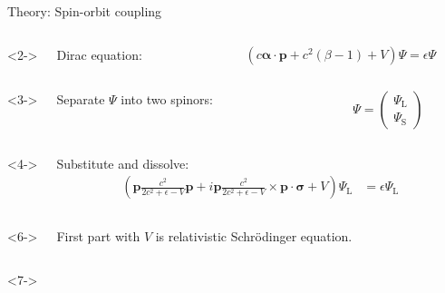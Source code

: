 \begin{frame}{Theory: Spin-orbit coupling}
	\begin{columns}<2->
		\begin{column}{.5\linewidth}
			Dirac equation:
		\end{column}\hspace{-3.3cm}
		\begin{column}{.7\linewidth}
			\begin{equation*}
			\left(
			c \boldsymbol\alpha \cdot \boldsymbol{p} + c^2(\beta - 1) + V
			\right) \Psi = \epsilon \Psi
			\end{equation*}
		\end{column}
	\end{columns}
	\begin{columns}<3->
		\begin{column}{.6\linewidth}
			Separate $\Psi$ into two spinors:
		\end{column}\hspace{-5cm}
		\begin{column}{.4\linewidth}
			\begin{equation*}
			\Psi = 
			\begin{pmatrix}
			\Psi_\text{L} \\ \Psi_\text{S}
			\end{pmatrix}
			\end{equation*}	
		\end{column}
	\end{columns}
	\begin{columns}<4->
		\begin{column}{\linewidth}
			Substitute and dissolve:
			\begin{align*}
			\left(
			\boldsymbol{p} \frac{c^2}{2c^2 + \epsilon - V} \boldsymbol{p} 
			+ i \boldsymbol{p} \frac{c^2}{2c^2 + \epsilon - V} \times \boldsymbol{p} \cdot \boldsymbol{\sigma} 
			+ V 
			\right) \Psi_\text{L} 
			&= \epsilon \Psi_\text{L}	
			\end{align*}
		\end{column}
	\end{columns}
	\vspace{.3cm}
	\begin{columns}<6->
		\begin{column}{\linewidth}
			First part with $V$ is relativistic Schrödinger equation.
		\end{column}
	\end{columns}
	\begin{columns}<7->
		\begin{column}{\linewidth}

\end{column}
\end{columns}
\end{frame}
